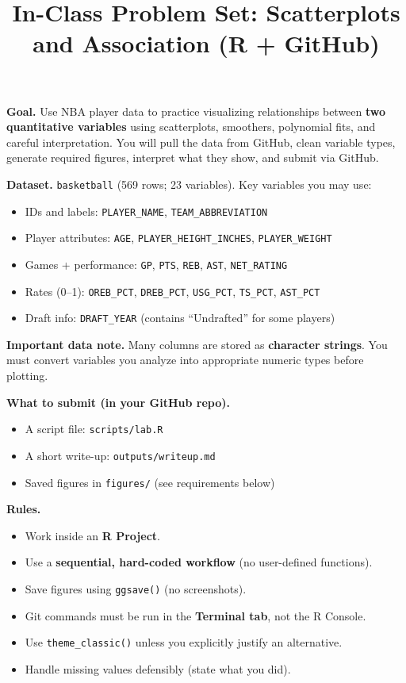 \documentclass[11pt]{article}
\title{In-Class Problem Set: Scatterplots and Association (R + GitHub)}
\author{}
\date{}
\begin{document}
\maketitle

\noindent \textbf{Goal.} Use NBA player data to practice visualizing relationships between \textbf{two quantitative variables} using scatterplots, smoothers, polynomial fits, and careful interpretation. You will pull the data from GitHub, clean variable types, generate required figures, interpret what they show, and submit via GitHub.

\medskip
\noindent \textbf{Dataset.} \texttt{basketball} (569 rows; 23 variables). Key variables you may use:
\begin{itemize}
  \item IDs and labels: \texttt{PLAYER\_NAME}, \texttt{TEAM\_ABBREVIATION}
  \item Player attributes: \texttt{AGE}, \texttt{PLAYER\_HEIGHT\_INCHES}, \texttt{PLAYER\_WEIGHT}
  \item Games + performance: \texttt{GP}, \texttt{PTS}, \texttt{REB}, \texttt{AST}, \texttt{NET\_RATING}
  \item Rates (0--1): \texttt{OREB\_PCT}, \texttt{DREB\_PCT}, \texttt{USG\_PCT}, \texttt{TS\_PCT}, \texttt{AST\_PCT}
  \item Draft info: \texttt{DRAFT\_YEAR} (contains ``Undrafted'' for some players)
\end{itemize}

\medskip
\noindent \textbf{Important data note.} Many columns are stored as \textbf{character strings}. You must convert variables you analyze into appropriate numeric types before plotting.

\medskip
\noindent \textbf{What to submit (in your GitHub repo).}
\begin{itemize}
  \item A script file: \texttt{scripts/lab.R}
  \item A short write-up: \texttt{outputs/writeup.md}
  \item Saved figures in \texttt{figures/} (see requirements below)
\end{itemize}

\medskip
\noindent \textbf{Rules.}
\begin{itemize}
  \item Work inside an \textbf{R Project}.
  \item Use a \textbf{sequential, hard-coded workflow} (no user-defined functions).
  \item Save figures using \texttt{ggsave()} (no screenshots).
  \item Git commands must be run in the \textbf{Terminal tab}, not the R Console.
  \item Use \texttt{theme\_classic()} unless you explicitly justify an alternative.
  \item Handle missing values defensibly (state what you did).
\end{itemize}
\end{document}
